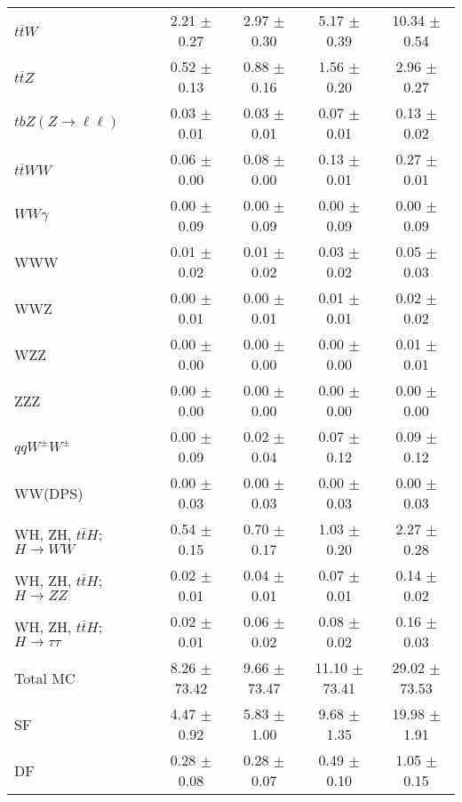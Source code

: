 \begin{tabular}{l|cccc}
                   $t\overline{t}W$ &  2.21 $\pm$  0.27 &  2.97 $\pm$  0.30 &  5.17 $\pm$  0.39 & 10.34 $\pm$  0.54 \\
                   $t\overline{t}Z$ &  0.52 $\pm$  0.13 &  0.88 $\pm$  0.16 &  1.56 $\pm$  0.20 &  2.96 $\pm$  0.27 \\
    $tbZ (Z \rightarrow \ell \ell)$ &  0.03 $\pm$  0.01 &  0.03 $\pm$  0.01 &  0.07 $\pm$  0.01 &  0.13 $\pm$  0.02 \\
                  $t\overline{t}WW$ &  0.06 $\pm$  0.00 &  0.08 $\pm$  0.00 &  0.13 $\pm$  0.01 &  0.27 $\pm$  0.01 \\
                         $WW\gamma$ &  0.00 $\pm$  0.09 &  0.00 $\pm$  0.09 &  0.00 $\pm$  0.09 &  0.00 $\pm$  0.09 \\
                                WWW &  0.01 $\pm$  0.02 &  0.01 $\pm$  0.02 &  0.03 $\pm$  0.02 &  0.05 $\pm$  0.03 \\
                                WWZ &  0.00 $\pm$  0.01 &  0.00 $\pm$  0.01 &  0.01 $\pm$  0.01 &  0.02 $\pm$  0.02 \\
                                WZZ &  0.00 $\pm$  0.00 &  0.00 $\pm$  0.00 &  0.00 $\pm$  0.00 &  0.01 $\pm$  0.01 \\
                                ZZZ &  0.00 $\pm$  0.00 &  0.00 $\pm$  0.00 &  0.00 $\pm$  0.00 &  0.00 $\pm$  0.00 \\
                 $qqW^{\pm}W^{\pm}$ &  0.00 $\pm$  0.09 &  0.02 $\pm$  0.04 &  0.07 $\pm$  0.12 &  0.09 $\pm$  0.12 \\
                            WW(DPS) &  0.00 $\pm$  0.03 &  0.00 $\pm$  0.03 &  0.00 $\pm$  0.03 &  0.00 $\pm$  0.03 \\
WH, ZH, $t\bar{t}H$; $H \rightarrow WW$ &  0.54 $\pm$  0.15 &  0.70 $\pm$  0.17 &  1.03 $\pm$  0.20 &  2.27 $\pm$  0.28 \\
WH, ZH, $t\bar{t}H$; $H \rightarrow ZZ$ &  0.02 $\pm$  0.01 &  0.04 $\pm$  0.01 &  0.07 $\pm$  0.01 &  0.14 $\pm$  0.02 \\
WH, ZH, $t\bar{t}H$; $H \rightarrow \tau\tau$ &  0.02 $\pm$  0.01 &  0.06 $\pm$  0.02 &  0.08 $\pm$  0.02 &  0.16 $\pm$  0.03 \\
\hline\hline
                           Total MC &  8.26 $\pm$ 73.42 &  9.66 $\pm$ 73.47 & 11.10 $\pm$ 73.41 & 29.02 $\pm$ 73.53 \\
\hline
                                 SF &  4.47 $\pm$  0.92 &  5.83 $\pm$  1.00 &  9.68 $\pm$  1.35 & 19.98 $\pm$  1.91 \\
                                 DF &  0.28 $\pm$  0.08 &  0.28 $\pm$  0.07 &  0.49 $\pm$  0.10 &  1.05 $\pm$  0.15 \\

\end{tabular}
